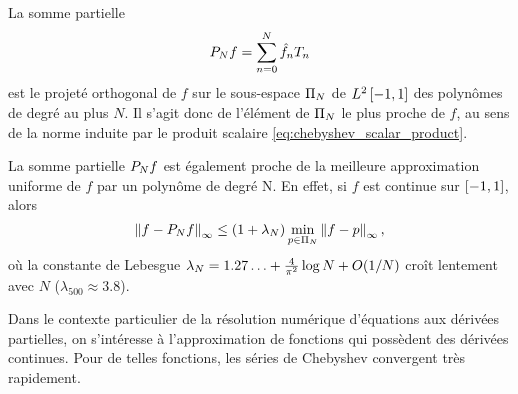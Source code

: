 La somme partielle
\begin{equation}
	\truncseries{f}{N} = \sum_{n=0}^{N} \hat{f}_n T_n
	\label{chebyshev_truncated_series}
\end{equation}
est le projeté orthogonal de $f$ sur le sous-espace $\polyspace{N}$ de $\Ltwospace$ des polynômes de degré au plus $N$.
Il s'agit donc de l'élément de $\polyspace{N}$ le plus proche de $f$, au sens de la norme induite par le produit scalaire \eqref{eq:chebyshev_scalar_product}.\par
La somme partielle $\truncseries{f}{N}$ est également proche de la meilleure approximation uniforme de $f$ par un polynôme de degré N. 
En effet, si $f$ est continue sur $\chebinterval$, alors
\begin{equation}
	\norminf{f - \truncseries{f}{N}} 
	\leq 
	\left(1 + \lambda_N \right) 
	\min_{p \in \polyspace{N}} \norminf{f - p},
	\label{eq:chebyshev_near_minimax}
\end{equation}
où la constante de Lebesgue $\lambda_N = 1.27\ldots + \frac{4}{\pi^2} \log N + \bigO{1/N}$ croît %
lentement avec $N$ ($\lambda_{500} \approx 3.8$).\par
Dans le contexte particulier de la résolution numérique d'équations aux dérivées partielles, %
on s'intéresse à l'approximation de fonctions qui possèdent des dérivées continues.
Pour de telles fonctions, les séries de Chebyshev convergent très rapidement.%
